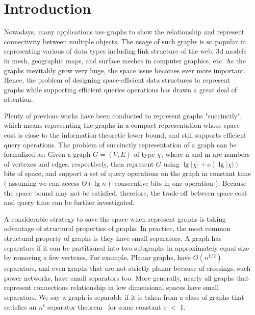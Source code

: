 \documentclass[12pt,glossary]{dalthesis}
\begin{document}
\mainmatter

\chapter{Introduction}

Nowadays, many applications use graphs to show the relationship and represent connectivity between multiple objects. The usage of such graphs is so popular in representing various of data types including link structure of the web, 3d models in mesh, geographic maps, and surface meshes in computer graphics, etc. As the graphs inevitably grow very huge, the space issue becomes ever more important. Hence, the problem of designing space-efficient data structures to represent graphs while supporting efficient queries operations has drawn a great deal of attention. 

\bigskip
Plenty of previous works have been conducted to represent graphs "succinctly", which means representing the graphs in a compact representation whose space cost is close to the information-theoretic lower bound, and still supports efficient query operations. The problem of succinctly representation of a graph can be formalized as: Given a graph $G = (V, E)$ of type $\chi$, where n and m are numbers of vertexes and edges, respectively, then represent $G$ using $\lg | \chi | + o(\lg | \chi | )$ bits of space, and support a set of query operations on the graph in constant time ( assuming we can access $\Theta(\lg n)$ consecutive bits in one operation ). Because the space bound may not be satisfied, therefore, the trade-off between space cost and query time can be further investigated.  

\bigskip

A considerable strategy to save the space when represent graphs is taking advantage of structural properties of graphs. In practice, the most common structural property of graphs is they have small separators. A graph has separators if it can be partitioned into two subgraphs in approximately equal size by removing a few vertexes. For example, Planar graphs, have $O(n^{1/2})$ separators, and even graphs that are not strictly planar because of crossings, such power networks, have small separators too. More generally, nearly all graphs that represent connections relationship in low dimensional spaces have small separators. We say a graph is separable if it is taken from a class of graphs that satisfies an $n^{c}$-separator theorem~\cite{separator-theorem} for some constant c $<$ 1.
\end{document}
